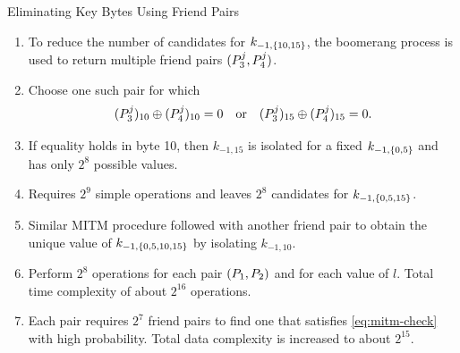 \documentclass[notheorems]{beamer}
\theoremstyle{definition}
\theoremstyle{example}
\begin{document}
    \begin{frame}[<+->]{Eliminating Key Bytes Using Friend Pairs}
        \begin{enumerate}
            \item To reduce the number of candidates for \(k_{-1, \{10,
            15\}}\), the boomerang process is used to return multiple friend
            pairs \((P_3^j, P_4^j)\).
            \item Choose one such pair for which
            \begin{equation}
                (P_3^j)_{10} \oplus (P_4^j)_{10} = 0 \quad \textrm{or} \quad (P_3^j)_{15} \oplus (P_4^j)_{15} = 0.
                \label{eq:mitm-check}
            \end{equation}
            \item If equality holds in byte 10, then \(k_{-1, 15}\) is isolated
            for a fixed \(k_{-1, \{0, 5\}}\) and has only \(2^8\) possible
            values.
            \item Requires \(2^9\) simple operations and leaves \(2^8\)
            candidates for \(k_{-1, \{0, 5, 15\}}\).
            \item Similar MITM procedure followed with another friend pair to
            obtain the unique value of \(k_{-1, \{0, 5, 10, 15\}}\) by
            isolating \(k_{-1, 10}\).
            \item Perform \(2^8\) operations for each pair \((P_1, P_2)\)
            and for each value of \(l\). Total time complexity of about
            \(2^{16}\) operations.
            \item Each pair requires \(2^7\) friend pairs to find one that
            satisfies \eqref{eq:mitm-check} with high probability. Total data
            complexity is increased to about \(2^{15}\).
        \end{enumerate} 
    \end{frame}
\end{document}

